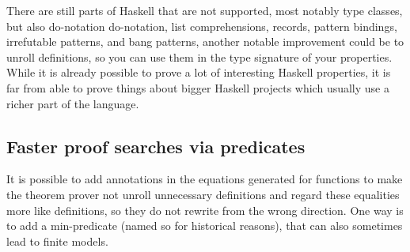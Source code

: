 There are still parts of Haskell that are not supported, most notably
type classes, but also do-notation do-notation, list comprehensions,
records, pattern bindings, irrefutable patterns,  and bang
patterns, another notable improvement could be to unroll 
definitions, so you can use them in the type signature of your
properties. While it is already possible to prove a lot of interesting
Haskell properties, it is far from able to prove things about bigger
Haskell projects which usually use a richer part of the language.

\subsection{Faster proof searches via predicates}

It is possible to add annotations in the equations generated for
functions to make the theorem prover not unroll unnecessary
definitions and regard these equalities more like definitions, so they
do not rewrite from the wrong direction. One way is to add a
min-predicate (named so for historical reasons), that can also
sometimes lead to finite models.


